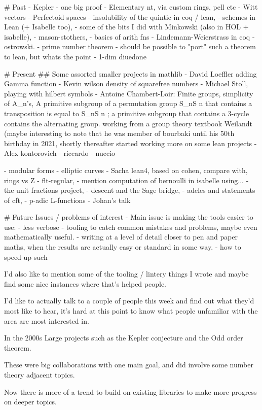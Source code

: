 \documentclass{beamer}
\theoremstyle{plain}
\begin{document}
{# Past
- Kepler - one big proof
- Elementary nt, via custom rings, pell etc
- Witt vectors
- Perfectoid spaces
- insolubility of the quintic in coq / lean,
- schemes in Lean (+ Isabelle too),
- some of the bits I did with Minkowski (also in HOL + isabelle),
- mason-stothers,
- basics of arith fns
- Lindemann-Weierstrass in coq
- ostrowski.
- prime number theorem
  - should be possible to "port" such a theorem to lean, but whats the point
- 1-dim diuedone

# Present 
## Some assorted smaller projects in mathlib
- David Loeffler adding Gamma function
- Kevin wilson density of squarefree numbers
- Michael Stoll, playing with hilbert symbols
- Antoine Chambert-Loir: Finite groups, simplicity of A_n's,
    A primitive subgroup of a permutation group \mathfrak S_nS
    n that contains a transposition is equal to \mathfrak S_nS
    n ; a primitive subgroup that contains a 3-cycle contains the alternating group.
  working from a group theory textbook Weilandt
  (maybe interesting to note that he was member of bourbaki until his 50th birthday in 2021,
  shortly thereafter started working more on some lean projects
- Alex kontorovich
- riccardo
- nuccio

- modular forms
- elliptic curves
- Sacha lean4, based on cohen, compare with, rings vs Z
- flt-regular, - mention computation of bernoulli in isabelle using...
- the unit fractions project,
- descent and the Sage bridge,
- adeles and statements of cft,
- p-adic L-functions
- Johan's talk

# Future
Issues / problems of interest
- Main issue is making the tools easier to use:
  - less verbose
  - tooling to catch common mistakes and problems, maybe even mathematically useful.
- writing at a level of detail closer to pen and paper maths, when the results are actually easy or standard in some way.
- how to speed up such 



I'd also like to mention some of the tooling / lintery things I wrote
and maybe find some nice instances where that's helped people.

I'd like to actually talk to a couple of people this week and find out
what they'd most like to hear, it's hard at this point to know what
people unfamiliar with the area are most interested in.

\begin{frame}{In the 2000s}
    Large projects such as the Kepler conjecture and the Odd order theorem.

    These were big collaborations with one main goal, and did involve some number theory adjacent topics.
    
    Now there is more of a trend to build on existing libraries to make more progress on deeper topics.
\end{frame}
}
\end{document}
